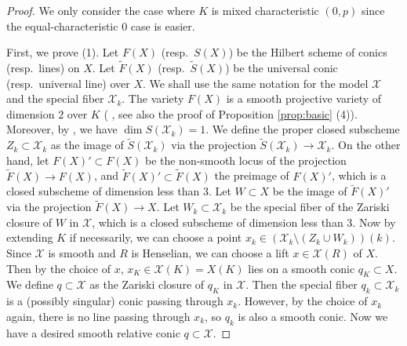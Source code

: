 \documentclass[autodetect-engine, a4paper]{amsart}
\theoremstyle{definition}
\begin{document}
\begin{proof}
We only consider the case where $K$ is mixed characteristic $(0,p)$ since the equal-characteristic $0$ case is easier.

First, we prove (1).
Let $F(X)$ (resp.\ $S(X)$) be the Hilbert scheme of conics (resp.\ lines) on $X$. 
Let $\widetilde{F}(X)$ (resp.\ $\widetilde{S}(X)$) be the universal conic (resp.\ universal line) over $X$. We shall use the same notation for the model $\mathcal{X}$ and the special fiber $\mathcal{X}_{k}$.
The variety $F(X)$ is a smooth projective variety of dimension $2$ over $K$ (
\cite[Theorem 5.3]{Kuznetsovderived}, see also the proof of Proposition \ref{prop:basic} (4)).
Moreover, by \cite[Proposition 5.4]{Tanaka2}, we have $\dim S(\mathcal{X}_{k}) =1$.
We define the proper closed subscheme $Z_{k} \subset \mathcal{X}_{k}$ as the image of 
$\widetilde{S}(\mathcal{X}_{k})$ via the projection $\widetilde{S}(\mathcal{X}_{k}) \rightarrow \mathcal{X}_{k}$.
On the other hand, let $F(X)' \subset F(X)$ be the non-smooth locus of the projection $\widetilde{F}(X) \rightarrow F(X)$,
and $\widetilde{F}(X)' \subset \widetilde{F}(X)$ the preimage of $F(X)'$, which is a closed subscheme of dimension less than $3$.
Let $W \subset X$ be the image of $\widetilde{F}(X)'$ via the projection $\widetilde{F} (X) \rightarrow X$.
Let $W_{k} \subset \mathcal{X}_{k}$ be the special fiber of the Zariski closure of $W$ in $\mathcal{X}$, which is a closed subscheme of dimension less than 3.
Now by extending $K$ if necessarily, we  can choose a point $x_{k} \in (\mathcal{X}_{k} \setminus (Z_{k} \cup W_{k}))(k)$.
Since $\mathcal{X}$ is smooth and $R$ is Henselian, we can choose a lift $x \in \mathcal{X} (R)$ of $X$.
Then by the choice of $x$, $x_{K} \in \mathcal{X} (K) = X(K)$ lies on a smooth conic $q_{K} \subset X$.
We define $q \subset \mathcal{X}$ as the Zariski closure of $q_{K}$ in $\mathcal{X}$. 
Then the special fiber $q_{k} \subset \mathcal{X}_{k}$ is a (possibly singular) conic passing through $x_{k}$.
However, by the choice of $x_{k}$ again, there is no line passing through $x_{k}$, so $q_{k}$ is also a smooth conic.
Now we have a desired smooth relative conic $q \subset \mathcal{X}$.


\end{proof}
\end{document}
